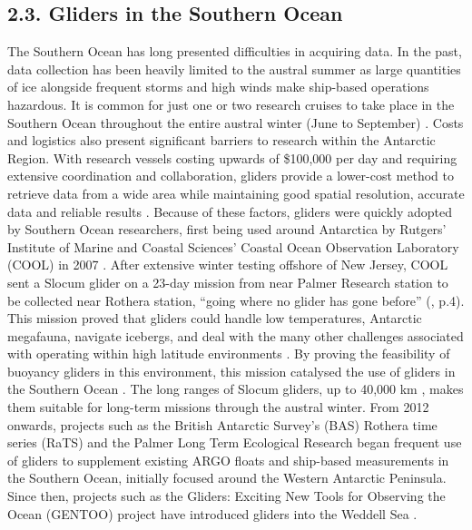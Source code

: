 \documentclass[
	a4paper, %
	10pt, %
	unnumberedsections, %
	twoside, %
]{LTJournalArticle}
\begin{document}
\begin{multicols}{2}
\subsection{2.3. Gliders in the Southern Ocean}
The Southern Ocean has long presented difficulties in acquiring data. In the past, data collection has been heavily limited to
the austral summer \citep{ref20} as large quantities of ice alongside frequent storms and high winds make ship-based operations
hazardous. It is common for just one or two research cruises to take place in the Southern Ocean throughout the entire austral
winter (June to September) \citep{ref20}. Costs and logistics also present significant barriers to research within the Antarctic
Region. With research vessels costing upwards of \$100,000 per day \citep{ref21} and requiring extensive coordination and
collaboration, gliders provide a lower-cost method to retrieve data from a wide area while maintaining good spatial resolution,
accurate data and reliable results \citep{ref15} . Because of these factors, gliders were quickly adopted by Southern Ocean
researchers, first being used around Antarctica by Rutgers’ Institute of Marine and Coastal Sciences’ Coastal Ocean Observation
Laboratory (COOL) in 2007 \citep{ref23}. After extensive winter testing offshore of New Jersey, COOL sent a Slocum glider on a
23-day mission from near Palmer Research station to be collected near Rothera station, “going where no glider has gone before”
(\cite{ref23}, p.4). This mission proved that gliders could handle low temperatures, Antarctic
megafauna, navigate icebergs, and deal with the many other challenges associated with operating within high latitude environments
\citep{ref23}. By proving the feasibility of buoyancy gliders in this environment, this mission catalysed the use of gliders in
the Southern Ocean \citep{ref25}. The long ranges of Slocum gliders, up to 40,000 km \citep{ref16}, makes them suitable for
long-term missions through the austral winter. From 2012 onwards, projects such as the British Antarctic Survey’s (BAS) Rothera
time series (RaTS) \citep{ref24} and the Palmer Long Term Ecological Research began frequent use of gliders to supplement existing
ARGO floats and ship-based measurements \citep{ref25} in the Southern Ocean, initially focused around the Western Antarctic
Peninsula. Since then, projects such as the Gliders: Exciting New Tools for Observing the Ocean (GENTOO) project have introduced
gliders into the Weddell Sea \citep{ref26}.


\end{multicols}
\end{document}
